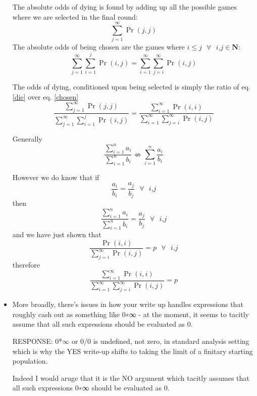 \documentclass[article,twocolumn]{memoir}
\begin{document}
\begin{itemize}
{        The absolute odds of dying is found by adding up all the possible games where we are selected in the final round:
        \begin{equation}
          \sum_{j=1}^{\infty} \Pr(j,j) \label{die}
        \end{equation} 
        The absolute odds of being chosen are the games where  $i\leq j \text{ }\forall \text{ } i\text{,}j \in \mathbf{N}$:
        \begin{equation}
          \sum_{j=1}^{\infty} \sum_{i=1}^{j} \Pr(i,j) = \sum_{i=1}^{\infty} \sum_{j=i}^{\infty} \Pr(i,j) \label{chosen} 
        \end{equation}
        
        The odds of dying, conditioned upon being selected is simply the ratio of eq. \ref{die} over eq. \ref{chosen}
        \begin{equation}
          \frac{\sum_{j=1}^{\infty} \Pr(j,j)}{\sum_{j=1}^{\infty} \sum_{i=1}^{j} \Pr(i,j)} = \frac{\sum_{i=1}^{\infty} \Pr(i,i)}{\sum_{i=1}^{\infty} \sum_{j=i}^{\infty} \Pr(i,j)}\label{theAnswer}
        \end{equation}

        Generally 
            $$\frac{\sum_{i=1}^{n} a_i}{\sum_{i=1}^{n} b_i}\nLeftrightarrow \sum_{i=1}^{n} \frac{a_i}{b_i}$$

        However we do know that if 
            $$\frac{a_i}{b_i}=\frac{a_j}{b_j} \text{   } \forall \text{ } i\text{,}j$$
        then
            $$\frac{\sum_{i=1}^{n} a_i}{\sum_{i=1}^{n} b_i} = \frac{a_j}{b_j}\text{   } \forall \text{ } i\text{,}j$$
        and we have just shown that 
            $$\frac{\Pr(i,i)}{\sum_{j=i}^\infty \Pr(i,j)} = p \text{   } \forall \text{ } i\text{,}j$$
        therefore 
            $$\frac{\sum_{i=1}^{\infty} \Pr(i,i)}{\sum_{i=1}^{\infty} \sum_{j=i}^{\infty} \Pr(i,j)}=p$$
    }


\item More broadly, there’s issues in how your write up handles expressions that roughly cash out as something like 0∗∞ - at the moment, it seems to tacitly assume that all such expressions should be evaluated as 0.
    
    {\color{violet}
        RESPONSE: 
        0*$\infty$ or 0/0 is undefined, not zero, in standard analysis setting which is why the YES write-up shifts to taking the limit of a finitary starting population.

        Indeed I would aruge that it is the NO argument which tacitly assumes that all such expressions 0∗∞ should be evaluated as 0.

}
\end{itemize}
\end{document}
